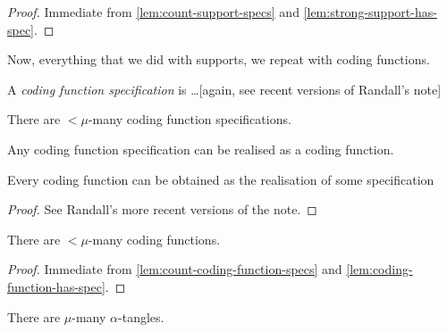 \begin{proof}
  Immediate from \cref{lem:count-support-specs} and \cref{lem:strong-support-has-spec}.
\end{proof}

Now, everything that we did with supports, we repeat with coding functions.

\begin{definition}
  \label{def:coding-function-spec}
  A \emph{coding function specification} is \ldots [again, see recent versions of Randall’s note]
\end{definition}

\begin{lemma}
  \label{lem:count-coding-function-specs}
  There are $<\mu$-many coding function specifications.
\end{lemma}

\begin{definition}
  \label{def:coding-function-spec-realisation}
  Any coding function specification can be realised as a coding function.
\end{definition}

\begin{lemma}
  \label{lem:coding-function-has-spec}
  Every coding function can be obtained as the realisation of some specification
\end{lemma}

\begin{proof}
  See Randall’s more recent versions of the note.
\end{proof}

\begin{corollary}
  \label{cor:count-coding-functions}
  There are $<\mu$-many coding functions.
\end{corollary}

\begin{proof}
  Immediate from \cref{lem:count-coding-function-specs} and \cref{lem:coding-function-has-spec}.
\end{proof}

\begin{corollary}
  \label{cor:count-tangles}
  There are $\mu$-many $\alpha$-tangles.
\end{corollary}


